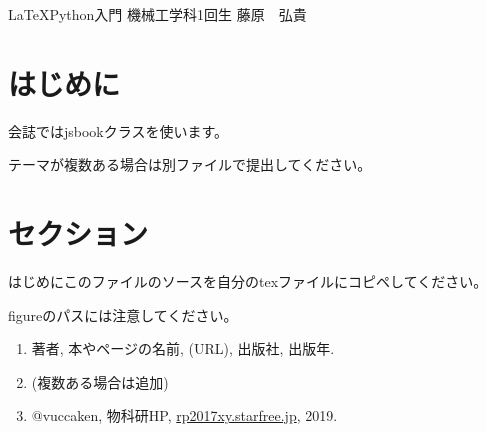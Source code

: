 \documentclass[10pt,b5paper,papersize,dvipdfmx]{jsbook}
\begin{document}

\kaishititle%
  {\LaTeX Python入門}%
  {機械工学科1回生}%
  {藤原　弘貴}%


%
\section*{はじめに}
会誌ではjsbookクラスを使います。\par
テーマが複数ある場合は別ファイルで提出してください。

%
\section{セクション}
はじめにこのファイルのソースを自分のtexファイルにコピペしてください。\par
figureのパスには注意してください。


\begin{sanko}
  \begin{enumerate}
    \item 著者, 本やページの名前, (URL), 出版社, 出版年.
    \item (複数ある場合は追加)
    \item @vuccaken, 物科研HP, \url{rp2017xy.starfree.jp}, 2019.
  \end{enumerate}
\end{sanko}
\end{document}
